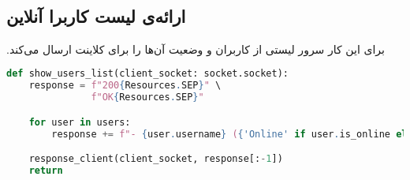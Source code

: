‫\subsection{ارائه‌ی لیست کاربرا آنلاین}
‫برای این کار سرور لیستی از کاربران و وضعیت آن‌ها را برای کلاینت ارسال می‌کند.
‫
\begin{latin}
\begin{lstlisting}[firstnumber=154, language=Python]
def show_users_list(client_socket: socket.socket):
    response = f"200{Resources.SEP}" \
               f"OK{Resources.SEP}"

    for user in users:
        response += f"- {user.username} ({'Online' if user.is_online else 'Offline'})\n"

    response_client(client_socket, response[:-1])
    return
\end{lstlisting}
\end{latin}

